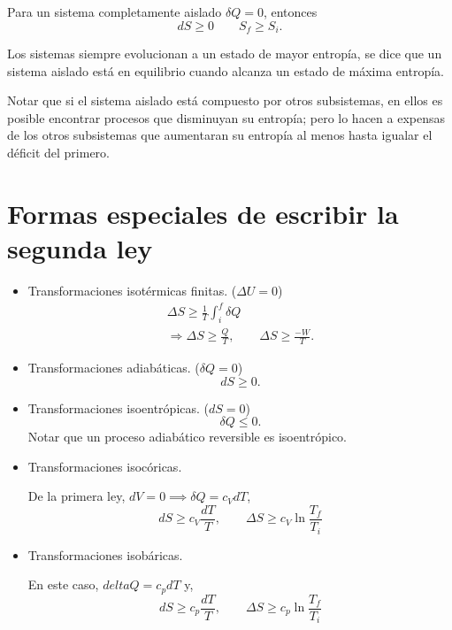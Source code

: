 \documentclass[openany]{book}
\begin{document}
\par Para un sistema completamente aislado $\delta Q=0$, entonces
\begin{equation*}
	dS\geq0\qquad S_f\geq S_i.
\end{equation*}

\par Los sistemas siempre evolucionan a un estado de mayor entropía, se dice que un sistema aislado está en equilibrio cuando alcanza un estado de máxima entropía.
\par Notar que si el sistema aislado está compuesto por otros subsistemas, en ellos es posible encontrar procesos que disminuyan su entropía; pero lo hacen a expensas de los otros subsistemas que aumentaran su entropía al menos hasta igualar el déficit del primero.

\section{Formas especiales de escribir la segunda ley}

\begin{itemize}
	\item Transformaciones isotérmicas finitas. ($\Delta U=0$)
	      \begin{gather*}
		      \Delta S\geq\frac{1}{T}\int_{i}^{f}\delta Q\\
		      \Rightarrow \Delta S\geq\frac{Q}{T},\qquad\Delta S\geq\frac{-W}{T}.
	      \end{gather*}
	\item Transformaciones adiabáticas. ($\delta Q=0$)
	      \begin{equation*}
		      dS\geq0.
	      \end{equation*}
	\item Transformaciones isoentrópicas. ($dS=0$)
	      \begin{equation*}
		      \delta Q\leq0.
	      \end{equation*}
	      Notar que un proceso adiabático reversible es isoentrópico.
	\item Transformaciones isocóricas.
	      \par De la primera ley, $dV=0\implies\delta Q=c_{V}dT$,
	      \begin{equation*}
		      dS\geq c_{V}\frac{dT}{T},\qquad\Delta S\geq c_{V}\ln{\frac{T_f}{T_i}}
	      \end{equation*}
	\item Transformaciones isobáricas.
	      \par En este caso, $delta Q=c_{p}dT$ y,
	      \begin{equation*}
		      dS\geq c_{p}\frac{dT}{T},\qquad \Delta S\geq c_{p}\ln{\frac{T_f}{T_i}}
	      \end{equation*}
\end{itemize}
\end{document}
